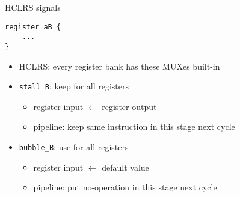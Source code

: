 \begin{frame}[fragile,label=HCLRSSigs]{HCLRS signals}
\begin{Verbatim}[fontsize=\small]
register aB { 
    ...
}
\end{Verbatim}
\begin{itemize}
\item HCLRS: every register bank has these MUXes built-in
\vspace{.5cm}
\item {\tt stall\_B}: keep  for all registers
    \begin{itemize}
        \item register input $\leftarrow$ register output
        \item pipeline: keep same instruction in this stage next cycle
    \end{itemize}
\item {\tt bubble\_B}: use  for all registers
    \begin{itemize}
        \item register input $\leftarrow$ default value
        \item pipeline: put no-operation in this stage next cycle
    \end{itemize}
\end{itemize}
\end{frame}

